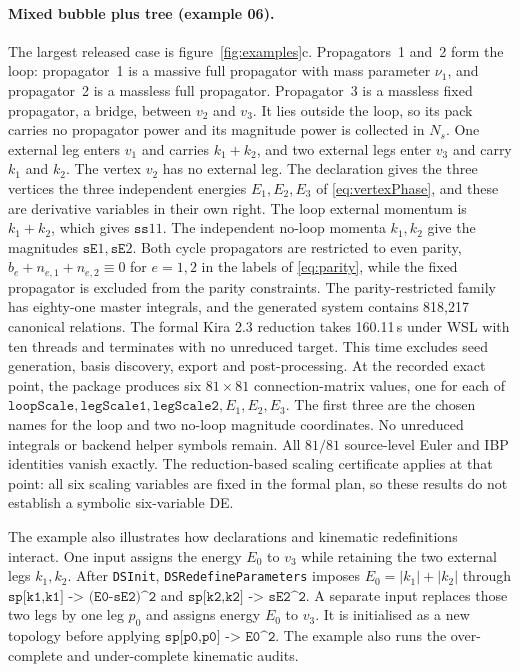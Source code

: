 \documentclass[11pt,a4paper]{article}
\begin{document}
\paragraph{Mixed bubble plus tree (example 06).}
The largest released case is figure~\ref{fig:examples}c. Propagators~1 and~2 form the loop:
propagator~1 is a massive full propagator with mass parameter $\nu_1$, and propagator~2 is a
massless full propagator. Propagator~3 is a massless fixed propagator, a bridge, between $v_2$ and
$v_3$. It lies
outside the loop, so
its pack carries no propagator power and its magnitude power is collected in $N_s$. One external leg enters $v_1$ and carries
$k_1+k_2$, and two external legs enter $v_3$ and carry $k_1$ and $k_2$. The vertex $v_2$ has no
external leg. The declaration gives the three vertices the three independent energies
$E_1,E_2,E_3$ of \eqref{eq:vertexPhase}, and these are derivative variables in their own right. The loop
external momentum is $k_1+k_2$, which gives $\texttt{ss}11$. The independent no-loop momenta
$k_1,k_2$ give the magnitudes $\texttt{sE}1,\texttt{sE}2$. Both cycle propagators are restricted to
even parity,
$b_e+n_{e,1}+n_{e,2}\equiv0$ for $e=1,2$ in the labels of \eqref{eq:parity}, while the
fixed propagator is excluded from the
parity constraints. The parity-restricted family has eighty-one master integrals, and the generated
system contains 818{,}217 canonical relations. The formal Kira 2.3 reduction takes 160.11\,s
under WSL with ten threads and terminates with no unreduced target. This time excludes seed
generation, basis discovery, export and post-processing. At the recorded exact point, the package
produces six $81\times81$ connection-matrix values, one for each of
$\texttt{loopScale},\texttt{legScale1},\texttt{legScale2},E_1,E_2,E_3$.
The first three are the chosen names for the loop and two no-loop magnitude coordinates.
No unreduced integrals or backend helper symbols remain. All $81/81$ source-level Euler and
IBP identities vanish exactly. The reduction-based scaling certificate applies at that point:
all six scaling variables are fixed in the formal plan, so these results do not establish a
symbolic six-variable DE.

The example also illustrates how declarations and kinematic
redefinitions interact. One input assigns the energy $E_0$ to $v_3$ while retaining the two
external legs $k_1,k_2$. After \texttt{DSInit}, \texttt{DSRedefineParameters} imposes
$E_0=|k_1|+|k_2|$ through
$\texttt{sp[k1,k1] -> (E0-sE2)\textasciicircum2}$ and
$\texttt{sp[k2,k2] -> sE2\textasciicircum2}$.
A separate input replaces those two legs by one leg $p_0$ and assigns energy $E_0$ to $v_3$.
It is initialised as a new topology before applying
$\texttt{sp[p0,p0] -> E0\textasciicircum2}$. The example also runs the
over-complete and under-complete kinematic audits.
\end{document}
